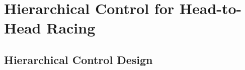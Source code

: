 \chapter{Hierarchical Control for Head-to-Head Racing} \label{chapter:hier}
\section{Hierarchical Control Design}
